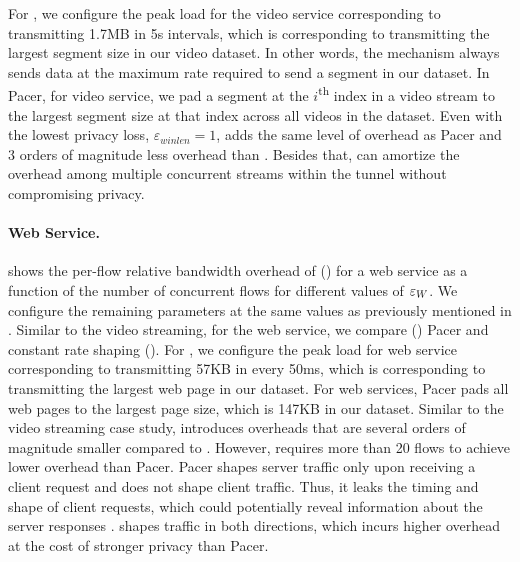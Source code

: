 For {\constshape}, we configure the peak load for the video service corresponding to
transmitting 1.7MB in 5s intervals, which is corresponding to transmitting the largest segment size in our video dataset. In other words, the {\constshape} mechanism always sends data at the maximum rate required to send a segment in our dataset.
In Pacer, for video service, we pad a segment at the $i$\textsuperscript{th} index
in a video stream to the largest segment size at that index across all videos in the dataset. 
Even with the lowest privacy loss, $\varepsilon_{winlen}=1$, {\ns} adds the same level of overhead as Pacer and 3 orders of magnitude less overhead than {\constshape}.  
Besides that, {\ns} can amortize the overhead
among multiple concurrent streams within the tunnel without compromising privacy.

\paragraph{Web Service.}
 shows the per-flow relative bandwidth overhead of {\sys} ({\ns}) for a web service as a function of the number of concurrent flows for different values of $\varepsilon_{W}$.
We configure the remaining parameters at the same values as previously mentioned in .
Similar to the video streaming, for the web service, we compare {\sys} ({\ns}) Pacer and constant rate shaping ({\constshape}).
For {\constshape}, we configure the peak load for web service corresponding to
transmitting 57KB in every 50ms, which is corresponding to transmitting the largest web page in our dataset.
For web services, Pacer pads all web pages to the largest page size, which is 147KB in our dataset.
Similar to the video streaming case study, {\ns} introduces overheads that are several orders of magnitude smaller compared to {\constshape}.
However, {\ns} requires more than 20 flows to achieve lower overhead than Pacer.
Pacer shapes server traffic only upon receiving a client request and does not
shape client traffic. 
Thus, it leaks the timing and shape of client requests, which could potentially reveal information about the server responses \cite{chen2010reality}.
{\sys} shapes traffic in both directions, which incurs higher overhead at the cost of stronger privacy than Pacer. 